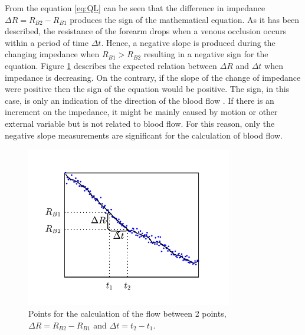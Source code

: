 
From the equation \ref{eq:QL} can be seen that the difference in impedance $\Delta R = R_{B2} - R_{B1}$ produces the sign of the mathematical equation. As it has been described, the resistance of the forearm drops when a venous occlusion occurs within a period of time $\Delta t$. Hence, a negative slope is produced during the changing impedance when $R_{B1} > R_{B2}$ resulting in a negative sign for the equation. Figure \ref{fig:relation R vs t} describes the expected relation between $\Delta R$ and $\Delta t$ when impedance is decreasing. On the contrary, if the slope of the change of impedance were positive then the sign of the equation would be positive. The sign, in this case, is only an indication of the direction of the blood flow \cite{nyober1950electrical}. If there is an increment on the impedance, it might be mainly caused by motion or other external variable but is not related to blood flow. For this reason, only the negative slope measurements are significant for the calculation of blood flow.

\begin{figure}[!htpb]
	\centering
	\includegraphics[width=9cm,keepaspectratio]{figure_vop_13}    
	\caption[Points for the calculation of the flow]{Points for the calculation of the flow between 2 points, $\Delta R = R_{B2} - R_{B1}$ and $\Delta t = t_2 - t_1$.}
	\label{fig:relation R vs t}
\end{figure}

